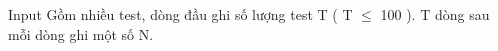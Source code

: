 Input
Gồm nhiều test, dòng đầu ghi số lượng test T ( T $\le$ 100 ). T dòng sau mỗi dòng ghi một số N.